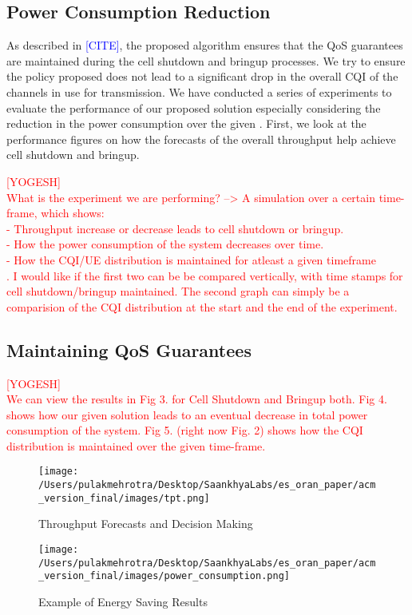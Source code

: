 \subsection{Power Consumption Reduction}

As described in \textcolor{blue}{[CITE]}, the proposed algorithm ensures that the QoS guarantees are maintained during the cell shutdown and bringup processes.
We try to ensure the policy proposed does not lead to a significant drop in the overall CQI of the channels in use for transmission.
We have conducted a series of experiments to evaluate the performance of our proposed solution especially considering the reduction in the power consumption over the given .
First, we look at the performance figures on how the forecasts of the overall throughput help achieve cell shutdown and bringup.

\textcolor{red}{[YOGESH] \\
What is the experiment we are performing? --> A simulation over a certain time-frame, which shows:\\
- Throughput increase or decrease leads to cell shutdown or bringup.\\
- How the power consumption of the system decreases over time.\\
- How the CQI/UE distribution is maintained for atleast a given timeframe \\.
I would like if the first two can be be compared vertically, with time stamps for cell shutdown/bringup maintained. 
The second graph can simply be a comparision of the CQI distribution at the start and the end of the experiment.}

\subsection{Maintaining QoS Guarantees}
\textcolor{red}{[YOGESH] \\
We can view the results in Fig 3. for Cell Shutdown and Bringup both.
Fig 4. shows how our given solution leads to an eventual decrease in total power consumption of the system.
Fig 5. (right now Fig. 2) shows how the CQI distribution is maintained over the given time-frame.}

\begin{figure}[ht]
  \centering
  \texttt{[image: /Users/pulakmehrotra/Desktop/SaankhyaLabs/es\_oran\_paper/acm\_version\_final/images/tpt.png]}
  \caption{Throughput Forecasts and Decision Making}
  \label{fig:tpt}
  \end{figure}

\begin{figure}[ht]
  \centering
  \texttt{[image: /Users/pulakmehrotra/Desktop/SaankhyaLabs/es\_oran\_paper/acm\_version\_final/images/power\_consumption.png]}
  \caption{Example of Energy Saving Results}
  \label{fig:power}
  \end{figure}


